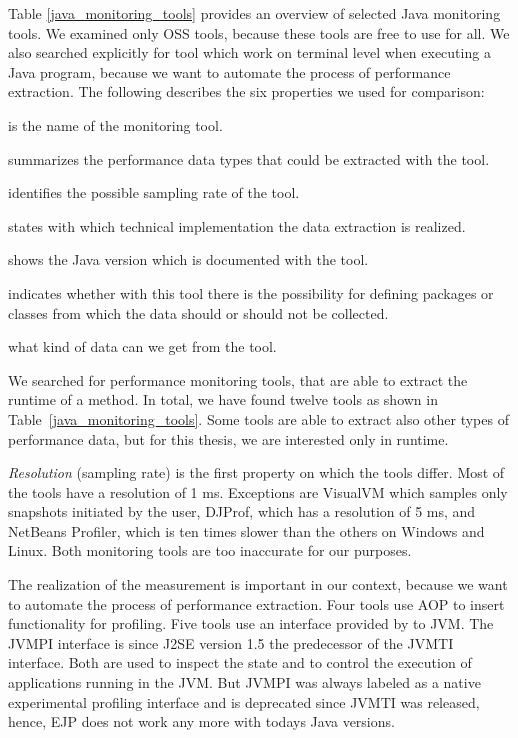 Table \ref{java_monitoring_tools} provides an overview of selected Java monitoring tools. We examined only \ac{OSS} tools, because these tools are free to use for all. We also searched explicitly for tool which work on terminal level when executing a Java program, because we want to automate the process of performance extraction. The following describes the six properties we used for comparison:
\begin{description}[style=multiline,leftmargin=8em]
	\item [Tool] is the name of the monitoring tool.
	\item [Performance Type] summarizes the performance data types that could be extracted with the tool.
	\item [Resolution] identifies the possible sampling rate of the tool.
	\item [Realization] states with which technical implementation the data extraction is realized.
	\item [Version] shows the Java version which is documented with the tool.
	\item [Filter] indicates whether with this tool there is the possibility for defining packages or classes from which the data should or should not be collected.
	\item [Output] what kind of data can we get from the tool. 
\end{description}


We searched for performance monitoring tools, that are able to extract the runtime of a method. In total, we have found twelve tools as shown in Table~\ref{java_monitoring_tools}. Some tools are able to extract also other types of performance data, but for this thesis, we are interested only in runtime. 

\textit{Resolution} (sampling rate) is the first property on which the tools differ. Most of the tools have a resolution of 1 ms. Exceptions are VisualVM which samples only snapshots initiated by the user, DJProf, which has a resolution of 5 ms, and NetBeans Profiler, which is ten times slower than the others on Windows and Linux. Both monitoring tools are too inaccurate for our purposes. 

The realization of the measurement is important in our context, because we want to automate the process of performance extraction. Four tools use \ac{AOP} to insert functionality for profiling. Five tools use an interface provided by to \ac{JVM}. The JVMPI interface is since J2SE version 1.5 the predecessor of the JVMTI interface. Both are used to inspect the state and to control the execution of applications running in the \ac{JVM}. But JVMPI was always labeled as a native experimental profiling interface and is deprecated since JVMTI was released, hence, EJP does not work any more with todays Java versions.

